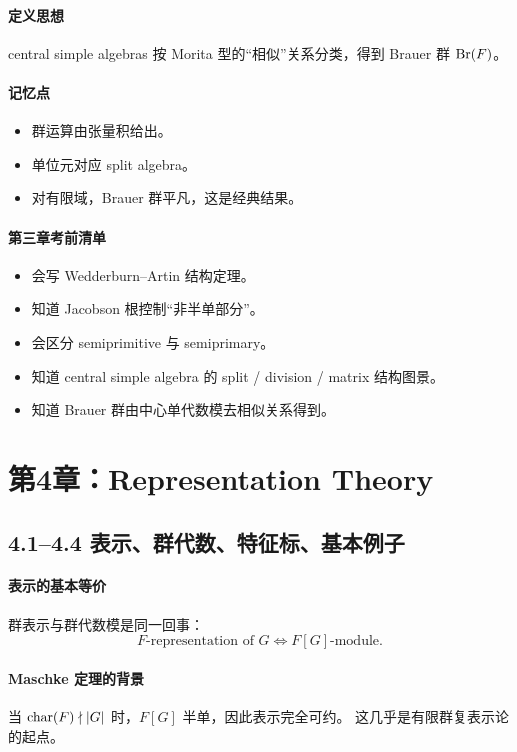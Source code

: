 \documentclass[a4paper]{ctexart}
\begin{document}
\paragraph{定义思想}
central simple algebras 按 Morita 型的“相似”关系分类，得到 Brauer 群 \({\rm Br}(F)\)。

\paragraph{记忆点}
\begin{itemize}
  \item 群运算由张量积给出。
  \item 单位元对应 split algebra。
  \item 对有限域，Brauer 群平凡，这是经典结果。
\end{itemize}

\paragraph{第三章考前清单}
\begin{itemize}
  \item 会写 Wedderburn--Artin 结构定理。
  \item 知道 Jacobson 根控制“非半单部分”。
  \item 会区分 semiprimitive 与 semiprimary。
  \item 知道 central simple algebra 的 split / division / matrix 结构图景。
  \item 知道 Brauer 群由中心单代数模去相似关系得到。
\end{itemize}

\section{第4章：Representation Theory}

\subsection{4.1--4.4 表示、群代数、特征标、基本例子}

\paragraph{表示的基本等价}
群表示与群代数模是同一回事：
\[
\text{\(F\)-representation of } G
\Longleftrightarrow
F[G]\text{-module}.
\]

\paragraph{Maschke 定理的背景}
当 \({\rm char}(F)\nmid |G|\) 时，\(F[G]\) 半单，因此表示完全可约。
这几乎是有限群复表示论的起点。
\end{document}
